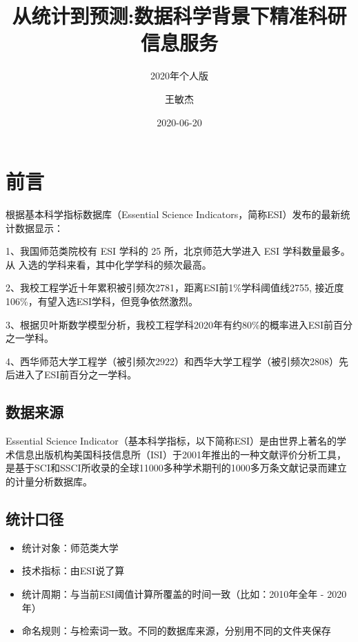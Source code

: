 \documentclass[cn, 11pt, fancy, hide]{elegantbook}
\title{从统计到预测:数据科学背景下精准科研信息服务}
\subtitle{2020年个人版}
\author{王敏杰}
\date{2020-06-20}
\providecommand{\tightlist}{%
  \setlength{\itemsep}{0pt}\setlength{\parskip}{0pt}}
\begin{document}
\maketitle

{
\setcounter{tocdepth}{2}
\tableofcontents
}
\mainmatter

\hypersetup{pageanchor=true}

\hypertarget{ux524dux8a00}{%
\chapter*{前言}\label{ux524dux8a00}}

根据基本科学指标数据库（Essential Science Indicators，简称ESI）发布的最新统计数据显示：

1、我国师范类院校有 ESI 学科的 25 所，北京师范大学进入 ESI 学科数量最多。从
入选的学科来看，其中化学学科的频次最高。

2、我校工程学近十年累积被引频次2781，距离ESI前1\%学科阈值线2755, 接近度106\%，有望入选ESI学科，但竞争依然激烈。

3、根据贝叶斯数学模型分析，我校工程学科2020年有约80\%的概率进入ESI前百分之一学科。

4、西华师范大学工程学（被引频次2922）和西华大学工程学（被引频次2808）先后进入了ESI前百分之一学科。

\hypertarget{ux6570ux636eux6765ux6e90}{%
\section*{数据来源}\label{ux6570ux636eux6765ux6e90}}

Essential Science Indicator（基本科学指标，以下简称ESI）是由世界上著名的学术信息出版机构美国科技信息所（ISI）于2001年推出的一种文献评价分析工具，是基于SCI和SSCI所收录的全球11000多种学术期刊的1000多万条文献记录而建立的计量分析数据库。

\hypertarget{ux7edfux8ba1ux53e3ux5f84}{%
\section*{统计口径}\label{ux7edfux8ba1ux53e3ux5f84}}

\begin{itemize}
\tightlist
\item
  统计对象：师范类大学
\item
  技术指标：由ESI说了算
\item
  统计周期：与当前ESI阈值计算所覆盖的时间一致（比如：2010年全年 - 2020年）
\item
  命名规则：与检索词一致。不同的数据库来源，分别用不同的文件夹保存
\end{itemize}
\end{document}
